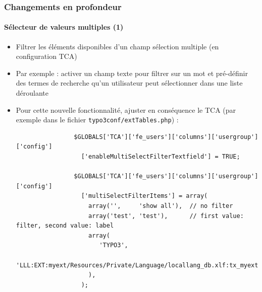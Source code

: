 \begin{frame}[fragile]
	\frametitle{Changements en profondeur}
	\framesubtitle{Sélecteur de valeurs multiples (1)}

	\lstset{
		basicstyle=\tiny\ttfamily
	}

	\begin{itemize}
		\item Filtrer les éléments disponibles d'un champ sélection multiple (en configuration TCA)
		\item Par exemple : activer un champ texte pour filtrer sur un mot et pré-définir des termes de recherche qu'un utilisateur peut sélectionner dans une liste déroulante

		\item Pour cette nouvelle fonctionnalité, ajuster en conséquence le TCA\newline
			(par exemple dans le fichier \texttt{typo3conf/extTables.php}) :

			\begin{lstlisting}
				$GLOBALS['TCA']['fe_users']['columns']['usergroup']['config']
				  ['enableMultiSelectFilterTextfield'] = TRUE;

				$GLOBALS['TCA']['fe_users']['columns']['usergroup']['config']
				  ['multiSelectFilterItems'] = array(
				  	array('',     'show all'),  // no filter
				  	array('test', 'test'),      // first value: filter, second value: label
				  	array(
				       'TYPO3',
				       'LLL:EXT:myext/Resources/Private/Language/locallang_db.xlf:tx_myext.label.typo3'
				  	),
				  );
			\end{lstlisting}

	\end{itemize}

\end{frame}


